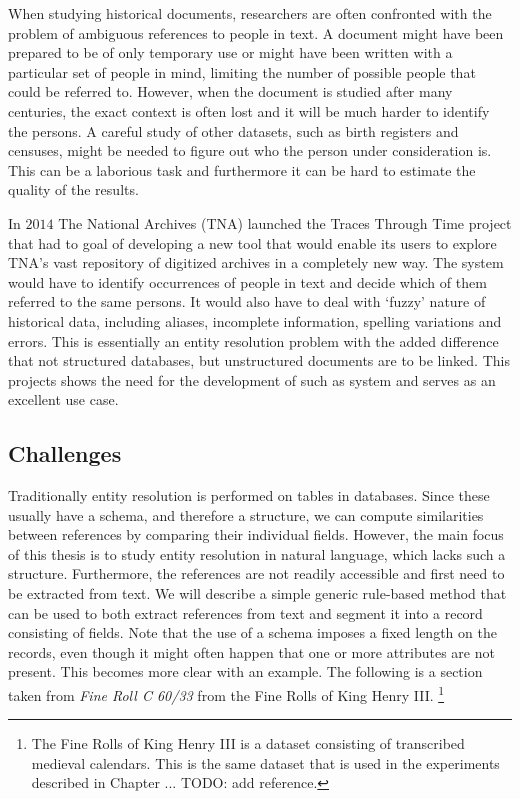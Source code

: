 \documentclass[paper=a4, fontsize=11pt]{scrartcl}
\begin{document}
When studying historical documents, researchers are often confronted with the problem of ambiguous references to people in text.
A document might have been prepared to be of only temporary use or might have been written with a particular set of people in mind, limiting the number of possible people that could be referred to.
However, when the document is studied after many centuries, the exact context is often lost and it will be much harder to identify the persons.
A careful study of other datasets, such as birth registers and censuses, might be needed to figure out who the person under consideration is.
This can be a laborious task and furthermore it can be hard to estimate the quality of the results.

In $2014$ The National Archives (TNA) launched the Traces Through Time project that had to goal of developing a new tool that would enable its users to explore TNA's vast repository of digitized archives in a completely new way.
The system would have to identify occurrences of people in text and decide which of them referred to the same persons.
It would also have to deal with `fuzzy' nature of historical data, including aliases, incomplete information, spelling variations and errors.
This is essentially an entity resolution problem with the added difference that not structured databases, but unstructured documents are to be linked.
This projects shows the need for the development of such as system and serves as an excellent use case.

\subsection{Challenges}
\label{sec:challenges}
Traditionally entity resolution is performed on tables in databases.
Since these usually have a schema, and therefore a structure, we can compute similarities between references by comparing their individual fields.
However, the main focus of this thesis is to study entity resolution in natural language, which lacks such a structure.
Furthermore, the references are not readily accessible and first need to be extracted from text.
We will describe a simple generic rule-based method that can be used to both extract references from text and segment it into a record consisting of fields.
Note that the use of a schema imposes a fixed length on the records, even though it might often happen that one or more attributes are not present.
This becomes more clear with an example.
The following is a section taken from \emph{Fine Roll C 60/33} from the Fine Rolls of King Henry III. \footnote{The Fine Rolls of King Henry III is a dataset consisting of transcribed medieval calendars. This is the same dataset that is used in the experiments described in Chapter ... TODO: add reference.}
\end{document}
